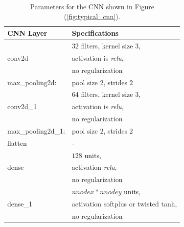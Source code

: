 \documentclass[12pt]{article}
\begin{document}
%
\begin{table}
 \centering
 \begin{tabular}{|l|l|}
   \hline
   CNN Layer & Specifications \\
   \hline
   \multirow{3}{*}{conv2d}  & $32$ filters, kernel size $3$,\\ & activation is \textit{relu},\\& no regularization\\
   \hline
   max\_pooling2d: & pool size $2$, strides $2$\\
   \hline
   \multirow{3}{*}{conv2d\_1} & $64$ filters, kernel size $3$,\\& activation is \textit{relu},\\ & no regularization\\
   \hline
   max\_pooling2d\_1: & pool size $2$, strides $2$\\
   \hline
   flatten & -\\
   \hline
   \multirow{3}{*}{dense}  & $128$ units,\\& activation \textit{relu},\\& no regularization\\
   \hline
   \multirow{3}{*}{dense\_1} & $nnodex*nnodey$ units,\\& activation softplus or twisted tanh,\\& no regularization\\
   \hline
 \end{tabular}
 \caption{\label{tab:cnnparams} Parameters for the CNN shown in Figure (\ref{fig:typical_cnn}).}
\end{table}
%
\end{document}
